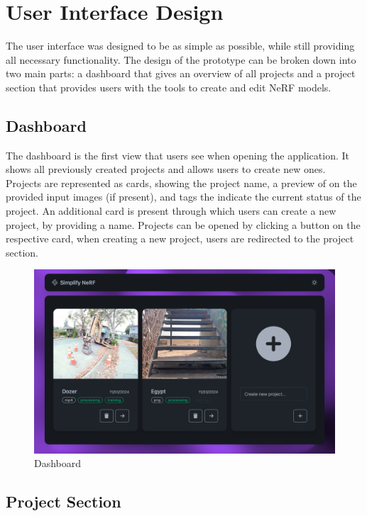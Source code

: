 %
\chapter{User Interface Design}
\label{sec:design}

The user interface was designed to be as simple as possible, while still providing all necessary functionality. 
The design of the prototype can be broken down into two main parts: a dashboard that gives an overview of all projects and a project section that provides users with the tools to create and edit NeRF models.

\section{Dashboard}

The dashboard is the first view that users see when opening the application. It shows all previously created projects and allows users to create new ones. 
Projects are represented as cards, showing the project name, a preview of on the provided input images (if present), and tags the indicate the current status of the project.
An additional card is present through which users can create a new project, by providing a name.
Projects can be opened by clicking a button on the respective card, when creating a new project, users are redirected to the project section.

\begin{figure}[htb]
  \includegraphics[width=\textwidth]{figures/view-overview.png}
  \caption{Dashboard}
  \label{fig:design:dashboard}
\end{figure}

\section{Project Section}


